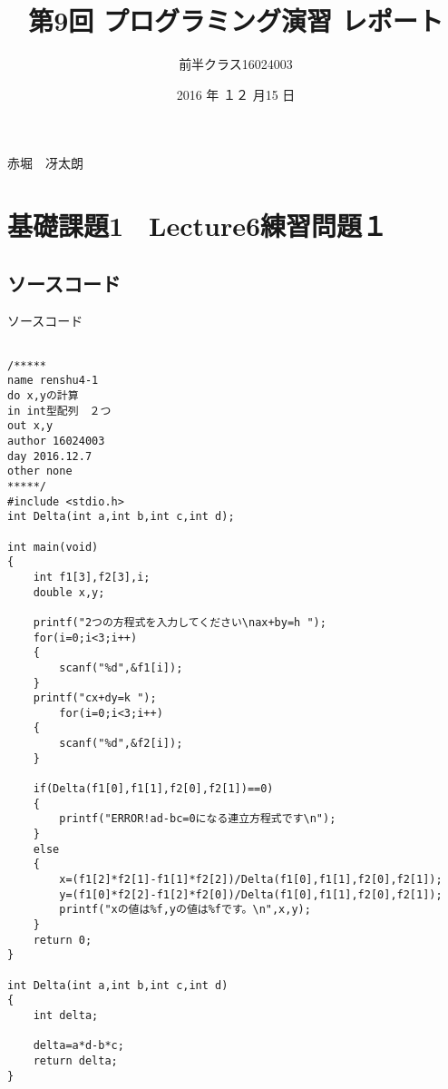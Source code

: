 \documentclass[a4j,titlepage]{jarticle}
\begin{document}

\title{第9回 プログラミング演習 レポート}

\author{前半クラス16024003}{赤堀　冴太朗}

\date{2016 年 １２ 月15 日}
\maketitle


\section{基礎課題1　Lecture6練習問題１}
\subsection{ソースコード}
\begin{breakitembox}[l]{ソースコード}
\begin{verbatim}

/*****
name renshu4-1
do x,yの計算
in int型配列　２つ
out x,y
author 16024003
day 2016.12.7
other none
*****/
#include <stdio.h>
int Delta(int a,int b,int c,int d);

int main(void)
{
    int f1[3],f2[3],i;
    double x,y;

    printf("2つの方程式を入力してください\nax+by=h ");
    for(i=0;i<3;i++)
    {
        scanf("%d",&f1[i]);
    }
    printf("cx+dy=k ");
        for(i=0;i<3;i++)
    {
        scanf("%d",&f2[i]);
    }

    if(Delta(f1[0],f1[1],f2[0],f2[1])==0)
    {
        printf("ERROR!ad-bc=0になる連立方程式です\n");
    }
    else 
    {
        x=(f1[2]*f2[1]-f1[1]*f2[2])/Delta(f1[0],f1[1],f2[0],f2[1]);
        y=(f1[0]*f2[2]-f1[2]*f2[0])/Delta(f1[0],f1[1],f2[0],f2[1]);
        printf("xの値は%f,yの値は%fです。\n",x,y);
    }
    return 0;
}

int Delta(int a,int b,int c,int d)
{
    int delta;

    delta=a*d-b*c;
    return delta;
}


\end{verbatim}
\end{breakitembox}
\end{document}
